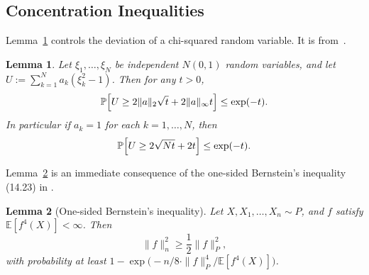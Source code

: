 \documentclass[aos]{imsart}
\theoremstyle{plain}
\newtheorem{lemma}{Lemma}
\theoremstyle{definition}
\theoremstyle{remark}
\newcommand{\Ebb}{\mathbb{E}}
\newcommand{\Pbb}{\mathbb{P}}
\newcommand{\1}{\mathbf{1}}
\begin{document}
\subsection{Concentration Inequalities}
Lemma~\ref{lem:chi_square_bound} controls the deviation of a chi-squared random variable. It is from~\cite{laurent00}.
\begin{lemma}
	\label{lem:chi_square_bound}
	Let $\xi_1,\ldots,\xi_N$ be independent $N(0,1)$ random variables, and let $U := \sum_{k = 1}^{N} a_k(\xi_k^2 - 1)$.  Then for any $t > 0$,
	\begin{equation*}
	\Pbb\Bigl[U \geq 2 \|a\|_2 \sqrt{t} + 2 \|a\|_{\infty}t\Bigr] \leq \exp(-t).
	\end{equation*}
	In particular if $a_k = 1$ for each $k = 1,\ldots,N$, then
	\begin{equation*}
	\Pbb\Bigl[U\geq 2\sqrt{N t} + 2t\Bigr] \leq \exp(-t).
	\end{equation*}
\end{lemma}

Lemma~\ref{lem:one_sided_bernstein} is an immediate consequence of the one-sided Bernstein's inequality (14.23) in \cite{wainwright2019}.
\begin{lemma}[One-sided Bernstein's inequality]
	\label{lem:one_sided_bernstein}
	Let $X, X_1,\ldots,X_n \sim P$, and $f$ satisfy $\Ebb[f^4(X)] < \infty$. Then
	\begin{equation*}
	\|f\|_n^2 \geq \frac{1}{2}\|f\|_P^2,
	\end{equation*}
	with probability at least $1 - \exp\bigl(-n/8 \cdot \|f\|_P^4 /\Ebb[f^4(X)]\bigr)$.
\end{lemma}
\end{document}
